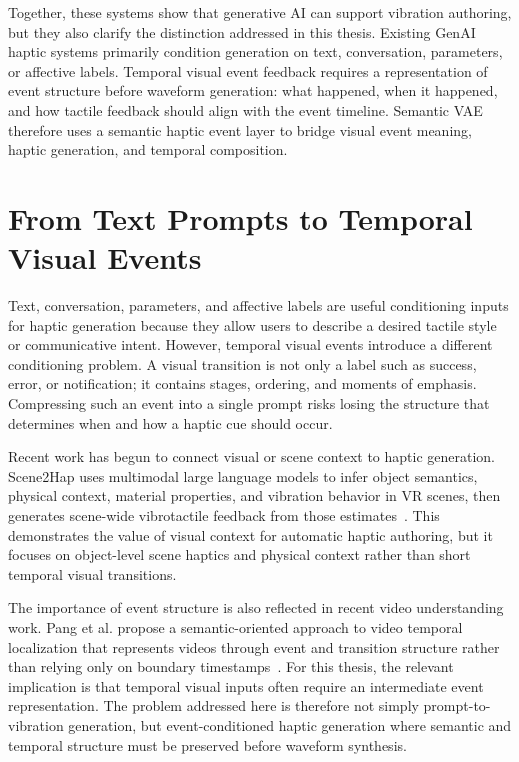 Together, these systems show that generative AI can support vibration authoring, but they also clarify the distinction addressed in this thesis. Existing GenAI haptic systems primarily condition generation on text, conversation, parameters, or affective labels. Temporal visual event feedback requires a representation of event structure before waveform generation: what happened, when it happened, and how tactile feedback should align with the event timeline. Semantic VAE therefore uses a semantic haptic event layer to bridge visual event meaning, haptic generation, and temporal composition.

\section{From Text Prompts to Temporal Visual Events}

Text, conversation, parameters, and affective labels are useful conditioning inputs for haptic generation because they allow users to describe a desired tactile style or communicative intent. However, temporal visual events introduce a different conditioning problem. A visual transition is not only a label such as success, error, or notification; it contains stages, ordering, and moments of emphasis. Compressing such an event into a single prompt risks losing the structure that determines when and how a haptic cue should occur.

Recent work has begun to connect visual or scene context to haptic generation. Scene2Hap uses multimodal large language models to infer object semantics, physical context, material properties, and vibration behavior in VR scenes, then generates scene-wide vibrotactile feedback from those estimates~\cite{jingu2026scene2hap}. This demonstrates the value of visual context for automatic haptic authoring, but it focuses on object-level scene haptics and physical context rather than short temporal visual transitions.

The importance of event structure is also reflected in recent video understanding work. Pang et al. propose a semantic-oriented approach to video temporal localization that represents videos through event and transition structure rather than relying only on boundary timestamps~\cite{pang2026measure}. For this thesis, the relevant implication is that temporal visual inputs often require an intermediate event representation. The problem addressed here is therefore not simply prompt-to-vibration generation, but event-conditioned haptic generation where semantic and temporal structure must be preserved before waveform synthesis.

